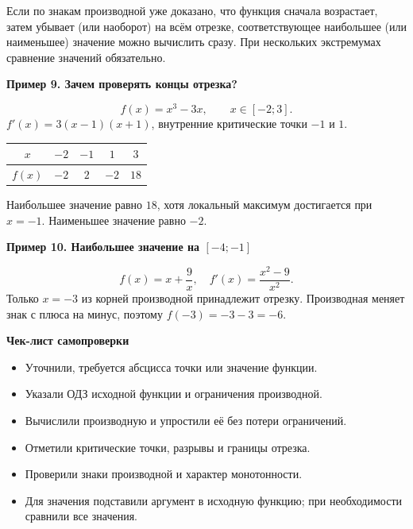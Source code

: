 \documentclass[a4paper,12pt]{article}
\newcommand{\ex}[1]{\par\medskip\textbf{#1}\par\smallskip}
\newcommand{\key}[1]{\par\smallskip\textcolor{darkaccent}{\textbf{#1}}\par\smallskip}
\begin{document}
Если по знакам производной уже доказано, что функция сначала возрастает, затем убывает (или наоборот) на всём отрезке, соответствующее наибольшее (или наименьшее) значение можно вычислить сразу. При нескольких экстремумах сравнение значений обязательно.
\ex{Пример 9. Зачем проверять концы отрезка?}
\[f(x)=x^3-3x,\qquad x\in[-2;3].\]
$f'(x)=3(x-1)(x+1)$, внутренние критические точки $-1$ и $1$.
\begin{center}
\begin{tabular}{@{}ccccc@{}}\toprule
$x$&$-2$&$-1$&$1$&$3$\\\midrule
$f(x)$&$-2$&$2$&$-2$&$18$\\\bottomrule
\end{tabular}
\end{center}
Наибольшее значение равно $18$, хотя локальный максимум достигается при $x=-1$. Наименьшее значение равно $-2$.
\ex{Пример 10. Наибольшее значение на $[-4;-1]$}
\[f(x)=x+\frac9x,\quad f'(x)=\frac{x^2-9}{x^2}.\]
Только $x=-3$ из корней производной принадлежит отрезку. Производная меняет знак с плюса на минус, поэтому $f(-3)=-3-3=-6$.
\key{Чек-лист самопроверки}
\begin{itemize}[label=$\square$]
\item Уточнили, требуется абсцисса точки или значение функции.
\item Указали ОДЗ исходной функции и ограничения производной.
\item Вычислили производную и упростили её без потери ограничений.
\item Отметили критические точки, разрывы и границы отрезка.
\item Проверили знаки производной и характер монотонности.
\item Для значения подставили аргумент в исходную функцию; при необходимости сравнили все значения.
\end{itemize}
\clearpage
\end{document}
